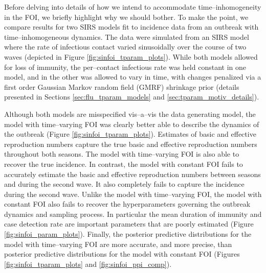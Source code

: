 Before delving into details of how we intend to accommodate time--inhomogeneity in the FOI, we briefly highlight why we should bother. To make the point, we compare results for two SIRS models fit to incidence data from an outbreak with time--inhomogeneous dynamics. The data were simulated from an SIRS model where the rate of infectious contact varied sinusoidally over the course of two waves (depicted in Figure \ref{fig:sinfoi_tparam_plots}). While both models allowed for loss of immunity, the per--contact infectious rate was held constant in one model, and in the other was allowed to vary in time, with changes penalized via a first order Gaussian Markov random field (GMRF) shrinkage prior (details presented in Sections \ref{sec:flu_tparam_models} and \ref{sec:tparam_motiv_details}). 

Although both models are misspecified vis--a--vis the  data generating model, the model with time--varying FOI was clearly better able to describe the dynamics of the outbreak (Figure \ref{fig:sinfoi_tparam_plots}). Estimates of basic and effective reproduction numbers capture the true basic and effective reproduction numbers throughout both seasons. The model with time--varying FOI is also able to recover the true incidence. In contrast, the model with constant FOI fails to accurately estimate the basic and effective reproduction numbers between seasons and during the second wave. It also completely fails to capture the incidence during the second wave. Unlike the model with time--varying FOI, the model with constant FOI also fails to recover the hyperparameters governing the outbreak dynamics and sampling process. In particular the mean duration of immunity and case detection rate are important parameters that are poorly estimated (Figure \ref{fig:sinfoi_param_plots}). Finally, the posterior predictive distributions for the model with time--varying FOI are more accurate, and more precise, than posterior predictive distributions for the model with constant FOI (Figures \ref{fig:sinfoi_tparam_plots} and \ref{fig:sinfoi_ppi_comp}).

